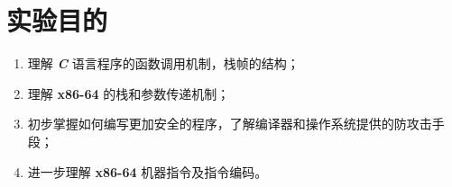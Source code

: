 \section{实验目的}
    \begin{enumerate}
        \item 理解 \textbf{\textit{C}} 语言程序的函数调用机制，栈帧的结构；
        \item 理解 \textbf{x86-64} 的栈和参数传递机制；
        \item 初步掌握如何编写更加安全的程序，了解编译器和操作系统提供的防攻击手段；
        \item 进一步理解 \textbf{x86-64} 机器指令及指令编码。
    \end{enumerate}